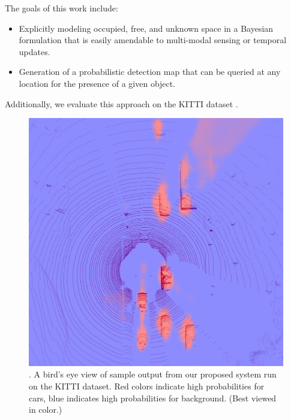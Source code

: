 The goals of this work include:
%
\begin{itemize}
  \item Explicitly modeling occupied, free, and unknown space in a Bayesian
    formulation that is easily amendable to multi-modal sensing or temporal
    updates.
  \item Generation of a probabilistic detection map that can be queried at any
    location for the presence of a given object.
\end{itemize}
%
Additionally, we evaluate this approach on the KITTI dataset
\cite{Geiger2013IJRR}.
%
\begin{figure}[!t]
  \includegraphics[width=\columnwidth]{figures/badge2.png}
  \caption{. A bird's eye
    view of sample output from our proposed system run on the KITTI dataset. Red colors indicate high
    probabilities for cars, blue indicates high probabilities for background.
    (Best viewed in color.) }
  \label{fig:badge}
\end{figure}

